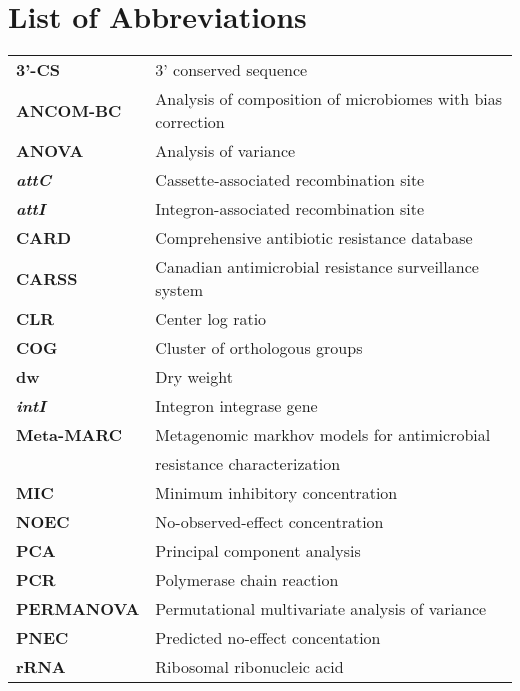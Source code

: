 \chapter*{List of Abbreviations}

\begin{longtable}{p{0.2\linewidth} p{0.8\linewidth}}
  \textbf{3'-CS} & 3' conserved sequence \\
  \textbf{ANCOM-BC} & Analysis of composition of microbiomes with bias correction \\
  \textbf{ANOVA} & Analysis of variance \\
  \textbf{\textit{attC}} & Cassette-associated recombination site \\
  \textbf{\textit{attI}} & Integron-associated recombination site \\
  \textbf{CARD} & Comprehensive antibiotic resistance database \\
  \textbf{CARSS} & Canadian antimicrobial resistance surveillance system \\
  \textbf{CLR} & Center log ratio \\
  \textbf{COG} & Cluster of orthologous groups \\
  \textbf{dw} & Dry weight \\
  \textbf{\textit{intI}} & Integron integrase gene \\
  \textbf{Meta-MARC} & Metagenomic markhov models for antimicrobial \\
                     & resistance characterization \\
  \textbf{MIC} & Minimum inhibitory concentration \\
  \textbf{NOEC} & No-observed-effect concentration \\
  \textbf{PCA} & Principal component analysis \\
  \textbf{PCR} & Polymerase chain reaction \\
  \textbf{PERMANOVA} & Permutational multivariate analysis of variance \\
  \textbf{PNEC} & Predicted no-effect concentation \\
  \textbf{rRNA} & Ribosomal ribonucleic acid
\end{longtable}
\setcounter{table}{0} %
